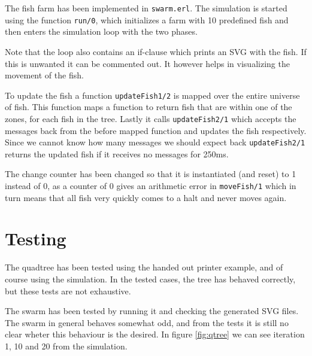 \documentclass[a4paper, 11pt]{article}
\begin{document}
The fish farm has been implemented in \texttt{swarm.erl}. The simulation is started using the function \texttt{run/0}, which initializes a farm with 10 predefined fish and then enters the simulation loop with the two phases.

Note that the loop also contains an if-clause which prints an SVG with the fish. If this is unwanted it can be commented out. It however helps in visualizing the movement of the fish.

To update the fish a function \texttt{updateFish1/2} is mapped over the entire universe of fish. This function maps a function to return fish that are within one of the zones, for each fish in the tree. Lastly it calls \texttt{updateFish2/1} which accepts the messages back from the before mapped function and updates the fish respectively. Since we cannot know how many messages we should expect back \texttt{updateFish2/1} returns the updated fish if it receives no messages for 250ms.

The change counter has been changed so that it is instantiated (and reset) to 1 instead of 0, as a counter of 0 gives an arithmetic error in \texttt{moveFish/1} which in turn means that all fish very quickly comes to a halt and never moves again.



\section{Testing} %
\label{sec:testing}

The quadtree has been tested using the handed out printer example, and of course using the simulation. In the tested cases, the tree has behaved correctly, but these tests are not exhaustive.

The swarm has been tested by running it and checking the generated SVG files. The swarm in general behaves somewhat odd, and from the tests it is still no clear wheter this behaviour is the desired. In figure \ref{fig:qtree} we can see iteration 1, 10 and 20 from the simulation.
\end{document}
